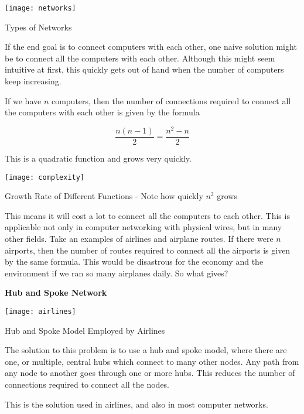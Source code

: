 \begin{marginfigure}
\texttt{[image: networks]}
\caption{Types of Networks}
\end{marginfigure}

If the end goal is to connect computers with each other,
one naive solution might be to connect all the computers
with each other. Although this might seem intuitive at
first, this quickly gets out of hand when the number of
computers keep increasing.

If we have $n$ computers, then the number of connections
required to connect all the computers with each other
is given by the formula

\[
\frac{n(n-1)}{2} = \frac{n^2 - n}{2}
\]

This is a quadratic function and grows very quickly.

\begin{marginfigure}
\texttt{[image: complexity]}
\caption{Growth Rate of Different Functions - Note how quickly $n^2$ grows}
\end{marginfigure}

This means it will cost a lot to connect all the computers
to each other. This is applicable not only in computer
networking with physical wires, but in many other fields.
Take an examples of airlines and airplane routes. If there
were $n$ airports, then the number of routes required to
connect all the airports is given by the same formula.
This would be disastrous for the economy and the environment
if we ran so many airplanes daily. So what gives?

\textbf{Hub and Spoke Network}

\begin{marginfigure}
\texttt{[image: airlines]}
\caption{Hub and Spoke Model Employed by Airlines}
\end{marginfigure}

The solution to this problem is to use a hub and spoke
model, where there are one, or multiple, central hubs
which connect to many other nodes. Any path from any
node to another goes through one or more hubs. This
reduces the number of connections required to connect
all the nodes.

This is the solution used in airlines, and also in
most computer networks.

